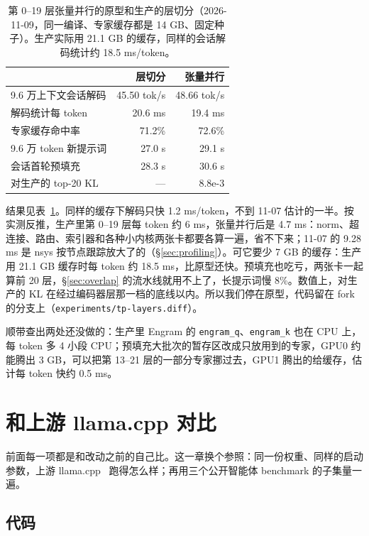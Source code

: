 \documentclass[11pt,a4paper]{article}
\newcommand{\code}[1]{\texttt{#1}}
\newcommand{\tps}{tok/s}
\begin{document}
\begin{table}[h]
  \centering
  \small
  \caption{第 0--19 层张量并行的原型和生产的层切分（2026-11-09，同一编译、专家缓存都是 14 GB、固定种子）。生产实际用 21.1 GB 的缓存，同样的会话解码统计约 18.5 ms/token。}
  \label{tab:tp}
  \begin{tabular}{@{}l r r@{}}
    \toprule
     & 层切分 & 张量并行 \\
    \midrule
    9.6 万上下文会话解码 & 45.50 \tps{} & 48.66 \tps{} \\
    解码统计每 token & 20.6 ms & 19.4 ms \\
    专家缓存命中率 & 71.2\% & 72.6\% \\
    9.6 万 token 新提示词 & 27.0 s & 29.1 s \\
    会话首轮预填充 & 28.3 s & 30.6 s \\
    对生产的 top-20 KL & — & 8.8e-3 \\
    \bottomrule
  \end{tabular}
\end{table}

结果见表~\ref{tab:tp}。同样的缓存下解码只快 1.2 ms/token，不到 11-07 估计的一半。按实测反推，生产里第 0--19 层每 token 约 6 ms，张量并行后是 4.7 ms：norm、超连接、路由、索引器和各种小内核两张卡都要各算一遍，省不下来；11-07 的 9.28 ms 是 nsys 按节点跟踪放大了的（\S\ref{sec:profiling}）。可它要少 7 GB 的缓存：生产用 21.1 GB 缓存时每 token 约 18.5 ms，比原型还快。预填充也吃亏，两张卡一起算前 20 层，\S\ref{sec:overlap} 的流水线就用不上了，长提示词慢 8\%。数值上，对生产的 KL 在经过编码器层那一档的底线以内。所以我们停在原型，代码留在 fork 的分支上（\code{experiments/tp-layers.diff}）。

顺带查出两处还没做的：生产里 Engram 的 \code{engram\_q}、\code{engram\_k} 也在 CPU 上，每 token 多 4 小段 CPU；预填充大批次的暂存区改成只放用到的专家，GPU0 约能腾出 3 GB，可以把第 13--21 层的一部分专家挪过去，GPU1 腾出的给缓存，估计每 token 快约 0.5 ms。

\section{和上游 llama.cpp 对比}
\label{sec:upstream}

前面每一项都是和改动之前的自己比。这一章换个参照：同一份权重、同样的启动参数，上游 llama.cpp~\cite{llamacpp} 跑得怎么样；再用三个公开智能体 benchmark 的子集量一遍。

\subsection{代码}
\label{sec:upstreamcode}
\end{document}
